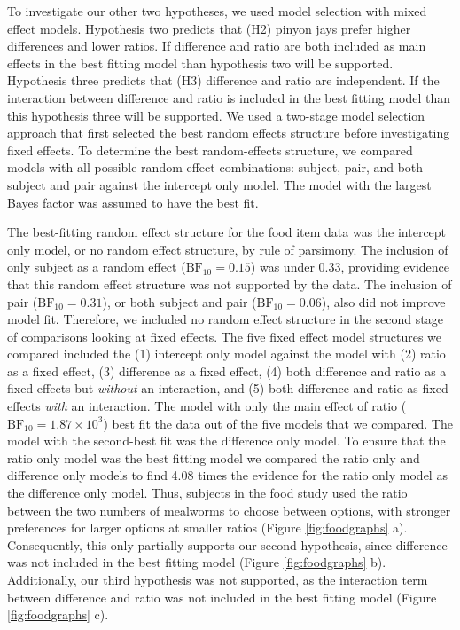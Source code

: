 \documentclass[
  english,
  ,doc,floatsintext]{apa6}
\begin{document}
To investigate our other two hypotheses, we used model selection with mixed effect models. Hypothesis two predicts that (H2) pinyon jays prefer higher differences and lower ratios. If difference and ratio are both included as main effects in the best fitting model than hypothesis two will be supported. Hypothesis three predicts that (H3) difference and ratio are independent. If the interaction between difference and ratio is included in the best fitting model than this hypothesis three will be supported. We used a two-stage model selection approach that first selected the best random effects structure before investigating fixed effects. To determine the best random-effects structure, we compared models with all possible random effect combinations: subject, pair, and both subject and pair against the intercept only model. The model with the largest Bayes factor was assumed to have the best fit.

The best-fitting random effect structure for the food item data was the intercept only model, or no random effect structure, by rule of parsimony. The inclusion of only subject as a random effect (\(\mathrm{BF}_{\textrm{10}} = 0.15\)) was under 0.33, providing evidence that this random effect structure was not supported by the data. The inclusion of pair (\(\mathrm{BF}_{\textrm{10}} = 0.31\)), or both subject and pair (\(\mathrm{BF}_{\textrm{10}} = 0.06\)), also did not improve model fit. Therefore, we included no random effect structure in the second stage of comparisons looking at fixed effects. The five fixed effect model structures we compared included the (1) intercept only model against the model with (2) ratio as a fixed effect, (3) difference as a fixed effect, (4) both difference and ratio as a fixed effects but \emph{without} an interaction, and (5) both difference and ratio as fixed effects \emph{with} an interaction. The model with only the main effect of ratio (\(\mathrm{BF}_{\textrm{10}} = 1.87 \times 10^{3}\)) best fit the data out of the five models that we compared. The model with the second-best fit was the difference only model. To ensure that the ratio only model was the best fitting model we compared the ratio only and difference only models to find 4.08 times the evidence for the ratio only model as the difference only model. Thus, subjects in the food study used the ratio between the two numbers of mealworms to choose between options, with stronger preferences for larger options at smaller ratios (Figure \ref{fig:foodgraphs} a). Consequently, this only partially supports our second hypothesis, since difference was not included in the best fitting model (Figure \ref{fig:foodgraphs} b). Additionally, our third hypothesis was not supported, as the interaction term between difference and ratio was not included in the best fitting model (Figure \ref{fig:foodgraphs} c).
\end{document}
